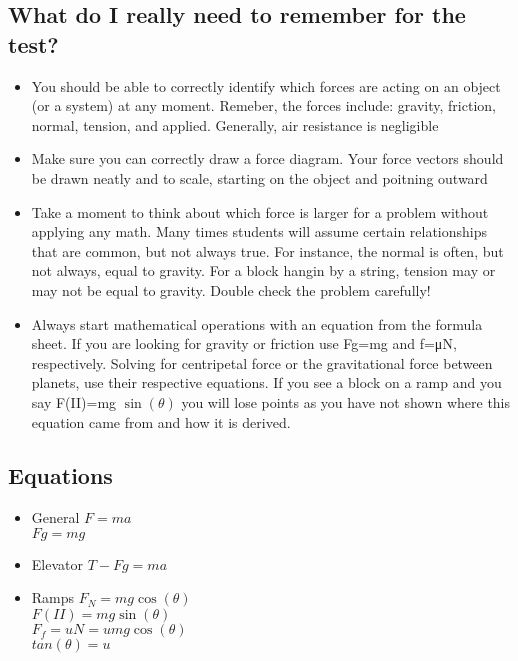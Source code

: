 \documentclass[11pt]{article}
\begin{document}
\subsection*{What do I really need to remember for the test?}
\label{sec:org1199ff5}
\begin{itemize}
\item You should be able to correctly identify which forces are acting on an object (or a system) at any moment. Remeber, the forces include: gravity, friction, normal, tension, and applied. Generally, air resistance is negligible
\item Make sure you can correctly draw a force diagram. Your force vectors should be drawn neatly and to scale, starting on the object and poitning outward
\item Take a moment to think about which force is larger for a problem without applying any math. Many times students will assume certain relationships that are common, but not always true.  For instance, the normal is often, but not always, equal to gravity.  For a block hangin by a string, tension may or may not be equal to gravity.  Double check the problem carefully!
\item Always start mathematical operations with an equation from the formula sheet.  If you are looking for gravity or friction use Fg=mg and f=μN, respectively.  Solving for centripetal force or the gravitational force between planets, use their respective equations.  If you see a block on a ramp and you say F(II)=mg \(\sin(\theta)\) you will lose points as you have not shown where this equation came from and how it is derived.
\end{itemize}
\subsection*{Equations}
\label{sec:orgfe450df}
\begin{itemize}
\item General
\label{sec:org79ccd0c}
\(F=ma\) \\
\(Fg=mg\) \\
\item Elevator
\label{sec:org99f4580}
\(T-Fg=ma\) \\
\item Ramps
\label{sec:orgfb7fff2}
\(F_N=mg\cos(\theta)\) \\
\(F(II)=mg\sin(\theta)\) \\
\(F_f=uN=umg\cos(\theta)\) \\
\(tan(\theta)=u\) \\
\end{itemize}
\end{document}
